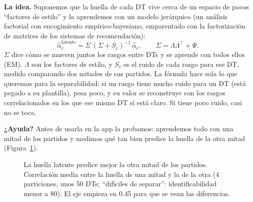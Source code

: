 \documentclass[10pt,a4paper,twocolumn]{article}
\begin{document}
\textbf{La idea.} Suponemos que la huella de cada DT vive cerca de un espacio de pocos ``factores de estilo'' y la aprendemos con un modelo jerárquico (un análisis factorial con encogimiento empírico-bayesiano, emparentado con la factorización de matrices de los sistemas de recomendación):
\begin{equation}
\hat\alpha^{\text{latente}}_{c} = \Sigma\,(\Sigma + S_c)^{-1}\,\hat\alpha_{c},
\qquad \Sigma = \Lambda\Lambda^{\top} + \Psi .
\end{equation}
$\Sigma$ dice cómo se mueven juntos los rasgos entre DTs y se aprende con todos ellos (EM). $\Lambda$ son los factores de estilo, y $S_c$ es el ruido de cada rasgo para ese DT, medido comparando dos mitades de sus partidos. La fórmula hace sola lo que queremos para la separabilidad: si un rasgo tiene mucho ruido para un DT (está pegado a su plantilla), pesa poco, y su valor se reconstruye con los rasgos correlacionados en los que ese mismo DT sí está claro. Si tiene poco ruido, casi no se toca.

\textbf{¿Ayuda?} Antes de usarla en la app la probamos: aprendemos todo con una mitad de los partidos y medimos qué tan bien predice la huella de la otra mitad (Figura~\ref{fig:latente}).

\begin{figure}[H]
\centering
{}
\caption{La huella latente predice mejor la otra mitad de los partidos. Correlación media entre la huella de una mitad y la de la otra (4 particiones, unos 50 DTs; ``difíciles de separar'': identificabilidad menor a 80). El eje empieza en 0.45 para que se vean las diferencias.}
\label{fig:latente}
\end{figure}
\end{document}
